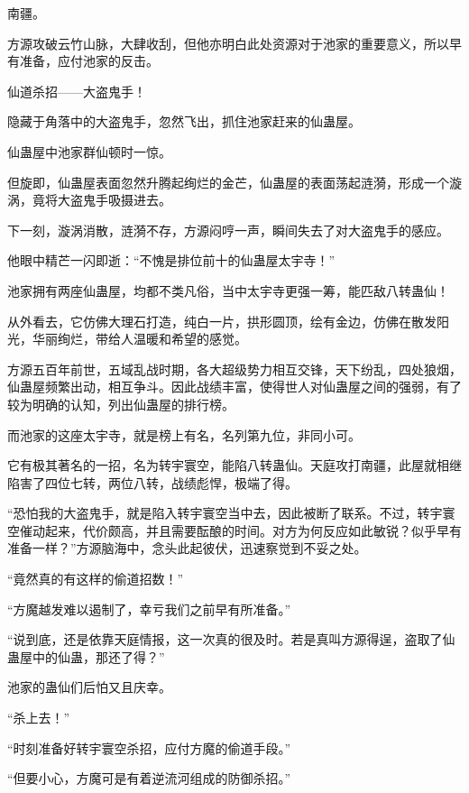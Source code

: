 
\begin{this_body}



南疆。

方源攻破云竹山脉，大肆收刮，但他亦明白此处资源对于池家的重要意义，所以早有准备，应付池家的反击。

仙道杀招——大盗鬼手！

隐藏于角落中的大盗鬼手，忽然飞出，抓住池家赶来的仙蛊屋。

仙蛊屋中池家群仙顿时一惊。

但旋即，仙蛊屋表面忽然升腾起绚烂的金芒，仙蛊屋的表面荡起涟漪，形成一个漩涡，竟将大盗鬼手吸摄进去。

下一刻，漩涡消散，涟漪不存，方源闷哼一声，瞬间失去了对大盗鬼手的感应。

他眼中精芒一闪即逝：“不愧是排位前十的仙蛊屋太宇寺！”

池家拥有两座仙蛊屋，均都不类凡俗，当中太宇寺更强一筹，能匹敌八转蛊仙！

从外看去，它仿佛大理石打造，纯白一片，拱形圆顶，绘有金边，仿佛在散发阳光，华丽绚烂，带给人温暖和希望的感觉。

方源五百年前世，五域乱战时期，各大超级势力相互交锋，天下纷乱，四处狼烟，仙蛊屋频繁出动，相互争斗。因此战绩丰富，使得世人对仙蛊屋之间的强弱，有了较为明确的认知，列出仙蛊屋的排行榜。

而池家的这座太宇寺，就是榜上有名，名列第九位，非同小可。

它有极其著名的一招，名为转宇寰空，能陷八转蛊仙。天庭攻打南疆，此屋就相继陷害了四位七转，两位八转，战绩彪悍，极端了得。

“恐怕我的大盗鬼手，就是陷入转宇寰空当中去，因此被断了联系。不过，转宇寰空催动起来，代价颇高，并且需要酝酿的时间。对方为何反应如此敏锐？似乎早有准备一样？”方源脑海中，念头此起彼伏，迅速察觉到不妥之处。

“竟然真的有这样的偷道招数！”

“方魔越发难以遏制了，幸亏我们之前早有所准备。”

“说到底，还是依靠天庭情报，这一次真的很及时。若是真叫方源得逞，盗取了仙蛊屋中的仙蛊，那还了得？”

池家的蛊仙们后怕又且庆幸。

“杀上去！”

“时刻准备好转宇寰空杀招，应付方魔的偷道手段。”

“但要小心，方魔可是有着逆流河组成的防御杀招。”


\end{this_body}
